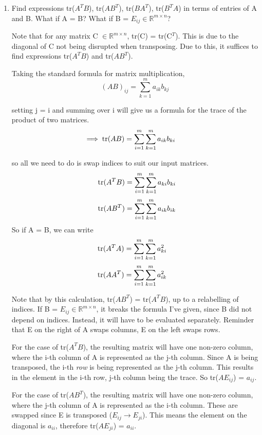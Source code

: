 \documentclass[12pt]{article}
\newcommand{\hop}{\vspace{1mm}}
\newcommand{\jump}{\vspace{5mm}}
\newcommand{\R}{\mathbb{R}}
\begin{document}
\begin{enumerate}[leftmargin=\labelsep]
\begin{enumerate}
\jump
\item Find expressions tr($A^TB$), tr($AB^T$), tr($BA^T$), tr($B^TA$) in terms of entries of A and B. What if A = B? What if B = $E_{ij} \in \R^{m \times n}$?

\hop
Note that for any matrix C $\in \R^{m \times n}$, tr(C) = tr(C$^T$). This is due to the diagonal of C not being disrupted when transposing. Due to this, it suffices to find expressions tr($A^TB$) and tr($AB^T$).

\hop
Taking the standard formula for matrix multiplication,
\[(AB)_{ij} = \sum_{k = 1}^m a_{ik}b_{kj}\]

setting j = i and summing over i will give us a formula for the trace of the product of two matrices.
\[
\hspace{-5mm}\implies \text{tr}(AB) = \sum_{i = 1}^m \sum_{k = 1}^m a_{ik}b_{ki}
\]

so all we need to do is swap indices to suit our input matrices.
\[
\hspace{2mm} \text{tr}(A^TB) = \sum_{i = 1}^m\sum_{k = 1}^m a_{ki}b_{ki}
\]
\[
\hspace{2mm} \text{tr}(AB^T) = \sum_{i = 1}^m\sum_{k = 1}^m a_{ik}b_{ik}
\]
So if A = B, we can write
\[
\hspace{-3mm} \text{tr}(A^TA) = \sum_{i = 1}^m\sum_{k = 1}^m a_{ki}^2
\]
\[
\hspace{-3mm} \text{tr}(AA^T) = \sum_{i = 1}^m\sum_{k = 1}^m a_{ik}^2
\]

\hop
Note that by this calculation, tr($AB^T$) = tr($A^TB$), up to a relabelling of indices. If B = $E_{ij} \in \R^{m \times n}$, it breaks the formula I've given, since B did not depend on indices. Instead, it will have to be evaluated separately. Reminder that E on the right of A swaps columns, E on the left swaps rows. 

\jump
For the case of tr($A^TB$), the resulting matrix will have one non-zero column, where the i-th column of A is represented as the j-th column. Since A is being transposed, the i-th \textit{row} is being represented as the j-th column. This results in the element in the i-th row, j-th column being the trace. So tr($AE_{ij}$) = $a_{ij}$.

\jump
For the case of tr($AB^T$), the resulting matrix will have one non-zero column, where the j-th column of A is represented as the i-th column. These are swapped since E is transposed ($E_{ij} \rightarrow E_{ji}$). This means the element on the diagonal is $a_{ii}$, therefore tr($AE_{ji}$) = $a_{ii}$. 


\end{enumerate}
\end{enumerate}
\end{document}

